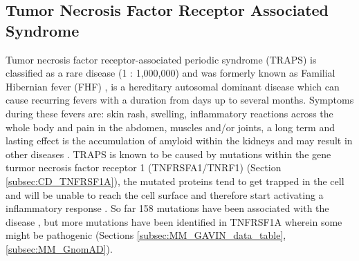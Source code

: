 \subsection{Tumor Necrosis Factor Receptor Associated Syndrome}
Tumor necrosis factor receptor-associated periodic syndrome (TRAPS) is classified as a rare disease (1 : 1,000,000) and was formerly known as Familial Hibernian fever (FHF) \cite{roth-wojcicki_tumor_2019}, is a hereditary autosomal dominant disease which can cause recurring fevers with a duration from days up to several months. Symptoms during these fevers are: skin rash, swelling, inflammatory reactions across the whole body and pain in the abdomen, muscles and/or joints, a long term and lasting effect is the accumulation of amyloid within the kidneys and may result in other diseases \cite{nih_traps_2016}. 
TRAPS is known to be caused by mutations within the gene turmor necrosis factor receptor 1 (TNFRSFA1/TNRF1) (Section \ref{subsec:CD_TNFRSF1A}), the mutated proteins tend to get trapped in the cell and will be unable to reach the cell surface and therefore start activating a inflammatory response \cite{kimberley_falling_2007, nih_traps_2016}.
So far 158 mutations have been associated with the disease \cite{aksentijevich_tumor-necrosis-factor_2001}, but more mutations have been identified in TNFRSF1A wherein some might be pathogenic (Sections \ref{subsec:MM_GAVIN_data_table}, \ref{subsec:MM_GnomAD}).
\label{subsec:CD_TRAPS}

